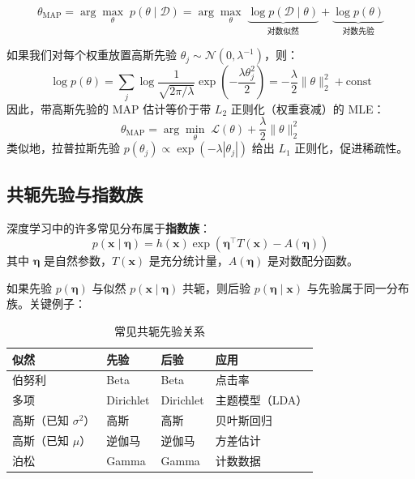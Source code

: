 \begin{定义}
\begin{equation}
\theta_{\text{MAP}} = \arg\max_{\theta} \; p(\theta \mid \mathcal{D}) = \arg\max_{\theta} \; \underbrace{\log p(\mathcal{D} \mid \theta)}_{\text{对数似然}} + \underbrace{\log p(\theta)}_{\text{对数先验}}
\end{equation}
\end{定义}

\begin{示例}
如果我们对每个权重放置高斯先验 $\theta_j \sim \mathcal{N}(0, \lambda^{-1})$，则：
\begin{equation}
\log p(\theta) = \sum_j \log \frac{1}{\sqrt{2\pi/\lambda}} \exp\left(-\frac{\lambda \theta_j^2}{2}\right) = -\frac{\lambda}{2}\|\theta\|_2^2 + \text{const}
\end{equation}
因此，带高斯先验的 MAP 估计等价于带 $L_2$ 正则化（权重衰减）的 MLE：
\begin{equation}
\theta_{\text{MAP}} = \arg\min_{\theta} \; \mathcal{L}(\theta) + \frac{\lambda}{2}\|\theta\|_2^2
\end{equation}
类似地，拉普拉斯先验 $p(\theta_j) \propto \exp(-\lambda|\theta_j|)$ 给出 $L_1$ 正则化，促进稀疏性。
\end{示例}

\subsection{共轭先验与指数族}

深度学习中的许多常见分布属于\textbf{指数族}：
\begin{equation}
p(\mathbf{x} \mid \boldsymbol{\eta}) = h(\mathbf{x}) \exp\left(\boldsymbol{\eta}^\top T(\mathbf{x}) - A(\boldsymbol{\eta})\right)
\end{equation}
其中 $\boldsymbol{\eta}$ 是自然参数，$T(\mathbf{x})$ 是充分统计量，$A(\boldsymbol{\eta})$ 是对数配分函数。

\begin{性质}[共轭先验]
如果先验 $p(\boldsymbol{\eta})$ 与似然 $p(\mathbf{x} \mid \boldsymbol{\eta})$ 共轭，则后验 $p(\boldsymbol{\eta} \mid \mathbf{x})$ 与先验属于同一分布族。关键例子：
\end{性质}

\begin{table}[ht]
    \centering
    \caption{常见共轭先验关系}
    \begin{tabular}{L{2.5cm} L{2.5cm} L{2.5cm} L{3cm}}
        \toprule
        \textbf{似然} & \textbf{先验} & \textbf{后验} & \textbf{应用} \\
        \midrule
        伯努利 & Beta & Beta & 点击率 \\
        多项 & Dirichlet & Dirichlet & 主题模型（LDA） \\
        高斯（已知 $\sigma^2$） & 高斯 & 高斯 & 贝叶斯回归 \\
        高斯（已知 $\mu$） & 逆伽马 & 逆伽马 & 方差估计 \\
        泊松 & Gamma & Gamma & 计数数据 \\
        \bottomrule
    \end{tabular}
\end{table}

